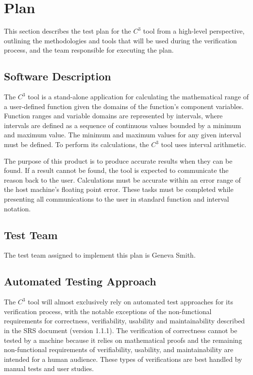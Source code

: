 \documentclass[12pt, titlepage]{article}
\newcommand{\prognameAbbrv}{$C^{3}$}
\newcommand{\srsVersion}{1.1.1}
\begin{document}
\section{Plan}
\label{testplan_highlevel}
This section describes the test plan for the \prognameAbbrv{} tool from a 
high-level perspective, outlining the methodologies and tools that will be used 
during the verification process, and the team responsible for executing the 
plan.
	
\subsection{Software Description}
The \prognameAbbrv{} tool is a stand-alone application for calculating 
the mathematical range of a user-defined function given the domains of the 
function's component variables. Function ranges and variable domains are 
represented by intervals, where intervals are defined as a sequence of 
continuous values bounded by a minimum and maximum value. The minimum and 
maximum values for any given interval must be defined. To perform its 
calculations, the \prognameAbbrv{} tool uses interval arithmetic.

The purpose of this product is to produce accurate results when they can be 
found. If a result cannot be found, the tool is expected to communicate the 
reason back to the user. Calculations must be accurate within an error range of 
the host machine's floating point error. These tasks must be completed while 
presenting all communications to the user in standard function and interval 
notation.

\subsection{Test Team}

The test team assigned to implement this plan is Geneva Smith.

\subsection{Automated Testing Approach}
The \prognameAbbrv{} tool will almost exclusively rely on automated test 
approaches for its verification process, with the notable exceptions of the 
non-functional requirements for correctness, verifiability, usability and 
maintainability described in the SRS document (version \srsVersion{}). The 
verification of correctness cannot be tested by a machine because it relies on 
mathematical proofs and the remaining non-functional requirements of 
verifiability, usability, and maintainability are intended for a 
human audience. These types of verifications are best handled by manual tests 
and user studies.
\end{document}
